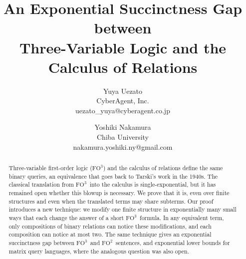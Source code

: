 \documentclass[11pt,letterpaper]{article}
\title{An Exponential Succinctness Gap between\protect\\Three-Variable Logic and the Calculus of Relations}
\author{Yuya Uezato \\
CyberAgent, Inc. \\
uezato\_yuya@cyberagent.co.jp
\and 
Yoshiki Nakamura \\
Chiba University \\
nakamura.yoshiki.ny@gmail.com
}
\date{}
\theoremstyle{definition}
\theoremstyle{remark}
\newcommand{\FOtwo}{\ensuremath{\mathrm{FO}^{2}}}
\newcommand{\FOthree}{\ensuremath{\mathrm{FO}^{3}}}
\begin{document}
\hypersetup{pageanchor=false}
\begin{titlepage}
\maketitle
\thispagestyle{empty}

\begin{abstract}
Three-variable first-order logic (\FOthree) and the calculus of relations
define the same binary queries, an
equivalence that goes back to Tarski's work in the 1940s. The classical
translation from \FOthree\ into the calculus is single-exponential, but it
has remained open whether this blowup is necessary. We prove that it is,
even over finite structures and even when the translated terms may share
subterms. Our proof introduces a new technique: we modify one finite
structure in exponentially many small ways that each change the answer of
a short \FOthree\ formula. In any equivalent term, only compositions of
binary relations can notice these modifications, and each composition can
notice at most two. The same technique gives an exponential succinctness
gap between \FOthree\ and \FOtwo\ sentences, and exponential lower bounds
for matrix query languages, where the analogous question was also open.
\end{abstract}
\end{titlepage}
\setcounter{page}{1}
\hypersetup{pageanchor=true}








%

\clearpage



\appendix




\end{document}
